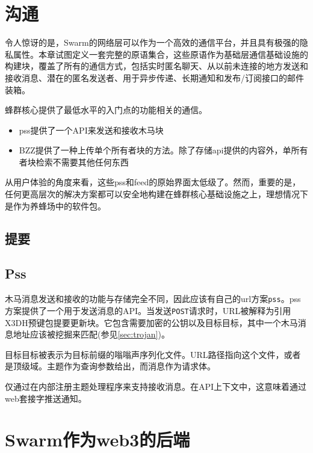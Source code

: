 \section{沟通\statusred}\label{sec:messaging}


令人惊讶的是，Swarm的网络层可以作为一个高效的通信平台，并且具有极强的隐私属性。本章试图定义一套完整的原语集合，这些原语作为基础层通信基础设施的构建块，覆盖了所有的通信方式，包括实时匿名聊天、从以前未连接的地方发送和接收消息、潜在的匿名发送者、用于异步传递、长期通知和发布/订阅接口的邮件装箱。

蜂群核心提供了最低水平的入门点的功能相关的通信。

\begin{itemize}
    \item pss提供了一个API来发送和接收木马块
    \item BZZ提供了一种上传单个所有者块的方法。除了存储api提供的内容外，单所有者块检索不需要其他任何东西
\end{itemize}



从用户体验的角度来看，这些pss和feed的原始界面太低级了。然而，重要的是，任何更高层次的解决方案都可以安全地构建在蜂群核心基础设施之上，理想情况下是作为养蜂场中的软件包。

\subsection{提要\statusorange}\label{sec:feeds-ux}


\subsection{Pss \statusorange}\label{sec:pss-ux}

木马消息发送和接收的功能与存储完全不同，因此应该有自己的url方案\lstinline{pss}。pss方案提供了一个用于发送消息的API。当发送\lstinline{POST}请求时，URL被解释为引用X3DH预键包提要更新块。它包含需要加密的公钥以及目标目标，其中一个木马消息地址应该被挖掘来匹配(参见\ref{sec:trojan})。

目标目标被表示为目标前缀的嗡嗡声序列化文件。URL路径指向这个文件，或者是顶级域。主题作为查询参数给出，而消息作为请求体。

仅通过在内部注册主题处理程序来支持接收消息。在API上下文中，这意味着通过web套接字推送通知。



\section{Swarm作为web3的后端 \statusred}\label{sec:buzz-apiary}

